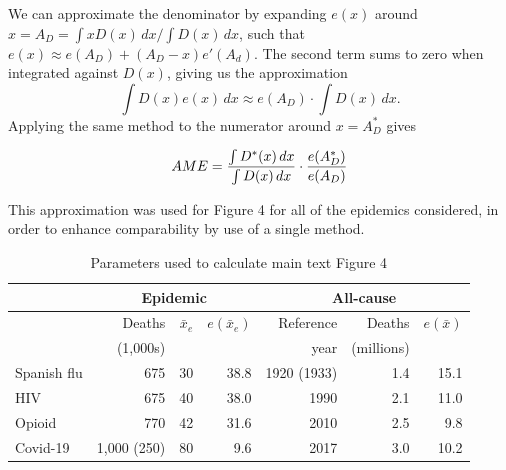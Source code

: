 \documentclass[9pt,twocolumn,twoside,lineno]{pnas-new}
\begin{document}
{We can approximate the denominator by expanding $e(x)$ around $x =
A_D = \int x D(x) \,dx / \int D(x)\,dx$, such that $e(x) \approx
e(A_D) + (A_D - x) e'(A_d)$. The second term sums to zero when
integrated against $D(x)$, giving us the approximation
\begin{equation}
  \int D(x) e(x) \,dx \approx  e(A_D) \cdot \int D(x) \, dx.
\end{equation}
Applying the same method to the numerator around $x = A^*_D$ gives

\begin{equation}
  AME = {\int D^*(x) \,dx \over \int D(x) \, dx} \cdot {e(A^*_D) \over e(A_D)}
\end{equation}

This approximation was used for Figure 4 for all of the epidemics
considered, in order to enhance comparability by use of a single
method.

\begin{table}[h]%
  \tiny
\centering
\caption{Parameters used to calculate main text Figure
  4}
\label{tbl:params}

\begin{tabular}{l|rrr|rrr}

  &   \multicolumn{3}{c|}{Epidemic} &  \multicolumn{3}{c}{All-cause} \\
\midrule
 & Deaths & $\bar{x}_e$    &  $e(\bar{x}_e)$ & Reference & Deaths &
                                                                 $e(\bar{x})$
                                                                 \\
  & (1,000s)       &      &           & year & (millions) &  \\     
\midrule
  Spanish flu & 675 & 30 & 38.8 & 1920 (1933) & 1.4 & 15.1 \\
  HIV         & 675 & 40 & 38.0 & 1990        & 2.1 & 11.0 \\
  Opioid &      770 & 42 & 31.6 & 2010        & 2.5 & 9.8 \\
  Covid-19 &    1,000 (250) & 80 & 9.6 & 2017        & 3.0 & 10.2 \\
\bottomrule
\end{tabular}
\normalsize

\end{table}



}
\end{document}
